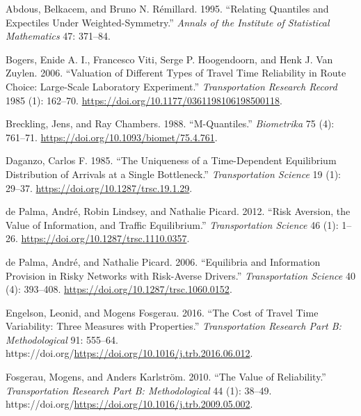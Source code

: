 \documentclass[
]{article}
\newlength{\cslhangindent}
\newlength{\cslentryspacingunit} %
\newenvironment{CSLReferences}[2] %
 {%
  \setlength{\parindent}{0pt}
  \ifodd #1
  \let\oldpar\par
  \def\par{\hangindent=\cslhangindent\oldpar}
  \fi
  \setlength{\parskip}{#2\cslentryspacingunit}
 }%
 {}
\theoremstyle{definition}
\theoremstyle{definition}
\theoremstyle{definition}
\theoremstyle{definition}
\theoremstyle{remark}
\begin{document}
\hypertarget{refs}{}
\begin{CSLReferences}{1}{0}
\leavevmode{}%
Abdous, Belkacem, and Bruno N. Rémillard. 1995. {``Relating Quantiles and Expectiles Under Weighted-Symmetry.''} \emph{Annals of the Institute of Statistical Mathematics} 47: 371--84.

\leavevmode{}%
Bogers, Enide A. I., Francesco Viti, Serge P. Hoogendoorn, and Henk J. Van Zuylen. 2006. {``Valuation of Different Types of Travel Time Reliability in Route Choice: Large-Scale Laboratory Experiment.''} \emph{Transportation Research Record} 1985 (1): 162--70. \url{https://doi.org/10.1177/0361198106198500118}.

\leavevmode{}%
Breckling, Jens, and Ray Chambers. 1988. {``M-Quantiles.''} \emph{Biometrika} 75 (4): 761--71. \url{https://doi.org/10.1093/biomet/75.4.761}.

\leavevmode{}%
Daganzo, Carlos F. 1985. {``The Uniqueness of a Time-Dependent Equilibrium Distribution of Arrivals at a Single Bottleneck.''} \emph{Transportation Science} 19 (1): 29--37. \url{https://doi.org/10.1287/trsc.19.1.29}.

\leavevmode{}%
de Palma, André, Robin Lindsey, and Nathalie Picard. 2012. {``Risk Aversion, the Value of Information, and Traffic Equilibrium.''} \emph{Transportation Science} 46 (1): 1--26. \url{https://doi.org/10.1287/trsc.1110.0357}.

\leavevmode{}%
de Palma, André, and Nathalie Picard. 2006. {``Equilibria and Information Provision in Risky Networks with Risk-Averse Drivers.''} \emph{Transportation Science} 40 (4): 393--408. \url{https://doi.org/10.1287/trsc.1060.0152}.

\leavevmode{}%
Engelson, Leonid, and Mogens Fosgerau. 2016. {``The Cost of Travel Time Variability: Three Measures with Properties.''} \emph{Transportation Research Part B: Methodological} 91: 555--64. https://doi.org/\url{https://doi.org/10.1016/j.trb.2016.06.012}.

\leavevmode{}%
Fosgerau, Mogens, and Anders Karlström. 2010. {``The Value of Reliability.''} \emph{Transportation Research Part B: Methodological} 44 (1): 38--49. https://doi.org/\url{https://doi.org/10.1016/j.trb.2009.05.002}.


\end{CSLReferences}
\end{document}

